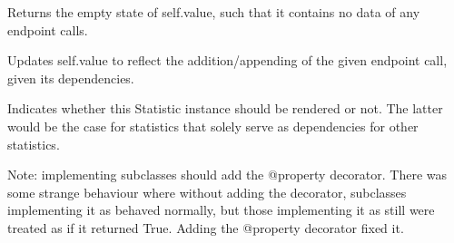 \documentclass[letterpaper,10pt,english]{sphinxmanual}
\begin{document}
\begin{fulllineitems}

\begin{fulllineitems}
\label{\detokenize{pydash_app.dashboard.aggregator.statistics:pydash_app.dashboard.aggregator.statistics.AverageExecutionTime.empty}}
Returns the empty state of self.value, such that it contains no data of any endpoint calls.

\end{fulllineitems}


\begin{fulllineitems}
\label{\detokenize{pydash_app.dashboard.aggregator.statistics:pydash_app.dashboard.aggregator.statistics.AverageExecutionTime.field_name}}
\end{fulllineitems}


\begin{fulllineitems}
\label{\detokenize{pydash_app.dashboard.aggregator.statistics:pydash_app.dashboard.aggregator.statistics.AverageExecutionTime.perform_append}}
Updates self.value to reflect the addition/appending of the given endpoint call, given its dependencies.

\end{fulllineitems}


\begin{fulllineitems}
\label{\detokenize{pydash_app.dashboard.aggregator.statistics:pydash_app.dashboard.aggregator.statistics.AverageExecutionTime.should_be_rendered}}
Indicates whether this Statistic instance should be rendered or not. The latter would be the case for statistics
that solely serve as dependencies for other statistics.

Note: implementing subclasses should add the @property decorator.
There was some strange behaviour where without adding the decorator,
subclasses implementing it as  behaved normally, but those implementing it as  still
were treated as if it returned True. Adding the @property decorator fixed it.

\end{fulllineitems}


\end{fulllineitems}
\end{document}
